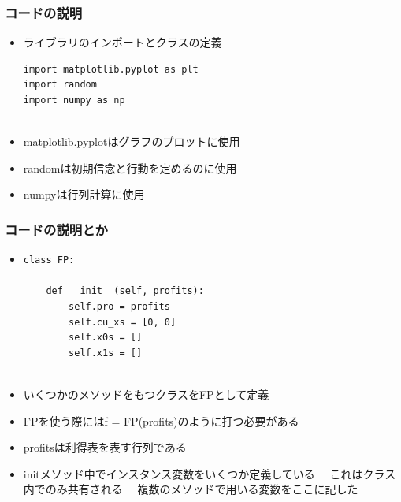 \documentclass[dvipdfmx,fleqn]{beamer}
\begin{document}
\begin{frame}[fragile]   %
\frametitle{コードの説明}
\begin{itemize}\setlength{\parskip}{0.5em}
\item
ライブラリのインポートとクラスの定義　\pause
\scriptsize
\begin{verbatim}
import matplotlib.pyplot as plt
import random
import numpy as np


\end{verbatim}
\pause
\normalsize
\item
matplotlib.pyplotはグラフのプロットに使用　\pause

\item
randomは初期信念と行動を定めるのに使用　\pause

\item
numpyは行列計算に使用


\end{itemize}
\end{frame}

\begin{frame}[fragile]%
\frametitle{コードの説明とか}
\begin{itemize}\setlength{\parskip}{0.5em}
\item

\scriptsize
\begin{verbatim}
class FP:

    def __init__(self, profits):
        self.pro = profits
        self.cu_xs = [0, 0]
        self.x0s = []
        self.x1s = []
 
 \end{verbatim}
\normalsize

\item
いくつかのメソッドをもつクラスをFPとして定義\pause
\item
FPを使う際にはf = FP(profits)のように打つ必要がある\pause
\item
profitsは利得表を表す行列である\pause
\item
initメソッド中でインスタンス変数をいくつか定義している　\pause
これはクラス内でのみ共有される　\pause
複数のメソッドで用いる変数をここに記した



\end{itemize}
\end{frame}
 
\end{document}
